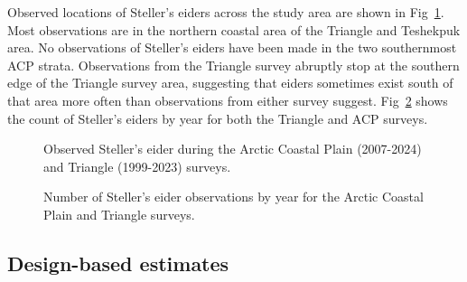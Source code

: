 \documentclass[
  10pt,
  letterpaper,
]{article}
\begin{document}
Observed locations of Steller's eiders across the study area are shown
in Fig~\ref{fig-observations}. Most observations are in the northern
coastal area of the Triangle and Teshekpuk area. No observations of
Steller's eiders have been made in the two southernmost ACP strata.
Observations from the Triangle survey abruptly stop at the southern edge
of the Triangle survey area, suggesting that eiders sometimes exist
south of that area more often than observations from either survey
suggest. Fig~\ref{fig-count} shows the count of Steller's eiders by year
for both the Triangle and ACP surveys.

\begin{figure}

\caption{\label{fig-observations}Observed Steller's eider during the
Arctic Coastal Plain (2007-2024) and Triangle (1999-2023) surveys.}

\end{figure}%

\begin{figure}

\caption{\label{fig-count}Number of Steller's eider observations by year
for the Arctic Coastal Plain and Triangle surveys.}

\end{figure}%

\subsection{Design-based estimates}\label{design-based-estimates-1}
\end{document}
